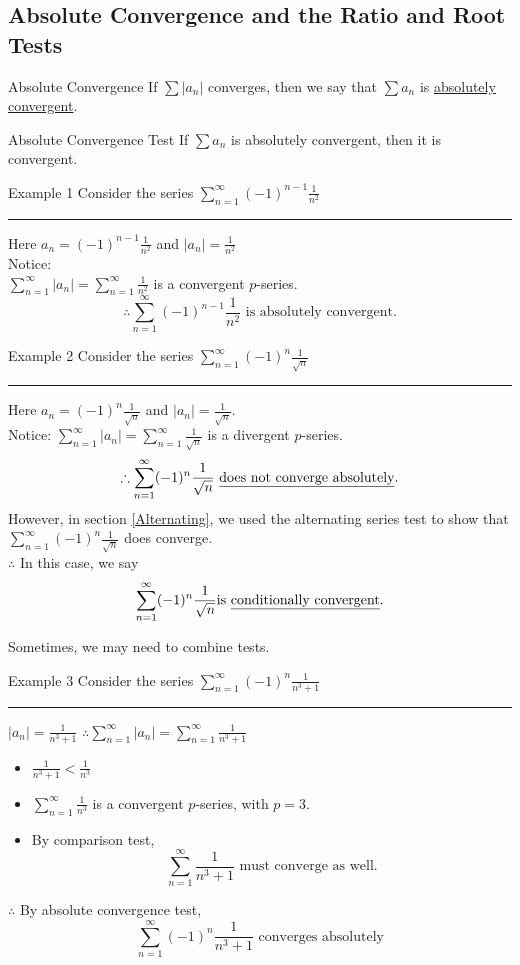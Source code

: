 \documentclass[12pt,a4paper]{article}
\begin{document}
\subsection{Absolute Convergence and the Ratio and Root Tests}
\begin{df}{Absolute Convergence}
	If $\displaystyle \sum|a_n|$ converges, then we say that $\displaystyle \sum{a_n}$ is \underline{absolutely convergent}.	
\end{df}
\begin{thm}{Absolute Convergence Test}
	If $\displaystyle \sum{a_n}$ is absolutely convergent, then it is convergent. 	
\end{thm}
\begin{eg}{Example 1}
	Consider the series $\displaystyle\sum_{n=1}^\infty(-1)^{n-1}\frac{1}{n^2}$\\
	\noindent\rule[0.25\baselineskip]{\textwidth}{1pt}	
	Here $\displaystyle a_n=(-1)^{n-1}\frac{1}{n^2}$ and $\displaystyle|a_n|=\frac{1}{n^2}$\\
	Notice: \\$\displaystyle\sum^\infty_{n=1}|a_n|=\sum^\infty_{n=1}\frac{1}{n^2}$ is a convergent $p$-series.
	$$\therefore\sum_{n=1}^\infty(-1)^{n-1}\frac{1}{n^2}\text{ is absolutely convergent.}$$
\end{eg}
\begin{eg}{Example 2}
	Consider the series $\displaystyle\sum_{n=1}^\infty(-1)^{n}\frac{1}{\sqrt{n}}$\\
	\noindent\rule[0.25\baselineskip]{\textwidth}{1pt}	
	Here $\displaystyle a_n=(-1)^n\frac{1}{\sqrt{n}}$ and $\displaystyle|a_n|=\frac{1}{\sqrt{n}}$.\\
	Notice: $\displaystyle\sum^\infty_{n=1}|a_n|=\sum^\infty_{n=1}\frac{1}{\sqrt{n}}$ is a divergent $p$-series.
	$$\therefore\sum_{n=1}^\infty(-1)^{n}\frac{1}{\sqrt{n}}\text{ \underline{does not converge absolutely}.}$$
	However, in section \ref{Alternating}, we used the alternating series test to show that $\displaystyle\sum_{n=1}^\infty(-1)^{n}\frac{1}{\sqrt{n}}$ does converge.\\
	$\therefore$ In this case, we say
	$$\sum_{n=1}^\infty(-1)^{n}\frac{1}{\sqrt{n}}\text{is \underline{conditionally convergent}.}$$
\end{eg}
Sometimes, we may need to combine tests. 
\begin{eg}{Example 3}
	Consider the series $\displaystyle\sum_{n=1}^\infty(-1)^{n}\frac{1}{n^3+1}$\\
	\noindent\rule[0.25\baselineskip]{\textwidth}{1pt}	
	$\displaystyle|a_n|=\frac{1}{n^3+1}$
	$\displaystyle \therefore\sum^\infty_{n=1}|a_n|=\sum^\infty_{n=1}\frac{1}{n^3+1}$
	\begin{itemize}
		\item $\displaystyle\frac{1}{n^3+1}<\frac{1}{n^3}$
		\item $\displaystyle\sum^\infty_{n=1}\frac{1}{n^3}$ is a convergent $p$-series, with $p=3$.
		\item By comparison test, $$\sum^\infty_{n=1}\frac{1}{n^3+1}\text{ must converge as well.}$$
	\end{itemize}
	$\therefore$ By absolute convergence test, 
	$$\sum_{n=1}^\infty(-1)^{n}\frac{1}{n^3+1}\text{ converges absolutely}$$
\end{eg}
\end{document}
